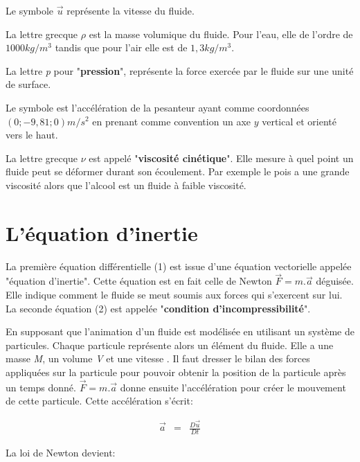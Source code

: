 \documentclass[11pt]{report}
\begin{document}
Le symbole $ \overrightarrow{u} $ représente la vitesse du fluide. \newline

La lettre grecque $  \rho $ est la masse volumique du fluide. Pour l'eau, elle de l'ordre de $ 1000kg/m^3 $ tandis que pour l'air elle est de $ 1,3kg/m^3 $. \newline

La lettre \textit{p} pour "\textbf{pression}", représente la force exercée par le fluide sur une unité de surface. \newline

Le symbole  est l'accélération de la pesanteur ayant comme coordonnées $(0; -9,81; 0) m/s^2 $ en prenant comme convention un axe $ y $ vertical et orienté vers le haut. \newline

La lettre grecque $\nu$ est appelé "\textbf{viscosité cinétique}". Elle mesure à quel point un fluide peut se déformer durant son écoulement. Par exemple le pois a une grande viscosité alors que l'alcool est un fluide à faible viscosité.

\section{L'équation d'inertie}

La première équation différentielle (1) est issue d'une équation vectorielle appelée "équation d'inertie". Cette équation est en fait celle de Newton $ \overrightarrow{F} = m. \overrightarrow{a} $ déguisée. Elle indique comment le fluide se meut soumis aux forces qui s'exercent sur lui. La seconde équation (2) est appelée "\textbf{condition d'incompressibilité}".

En supposant que l'animation d'un fluide est modélisée en utilisant un système de particules. Chaque particule représente alors un élément du fluide. Elle a une masse \textit{M}, un volume \textit{V} et une vitesse . Il faut dresser le bilan des forces appliquées sur la particule pour pouvoir obtenir la position de la particule après un temps donné. $ \overrightarrow{F} = m. \overrightarrow{a} $ donne ensuite l'accélération pour créer le mouvement de cette particule. Cette accélération s'écrit:

\begin{eqnarray}
\overrightarrow{a} & = & \frac{D \overrightarrow{u}}{Dt}
\end{eqnarray}

La loi de Newton devient:
\end{document}
